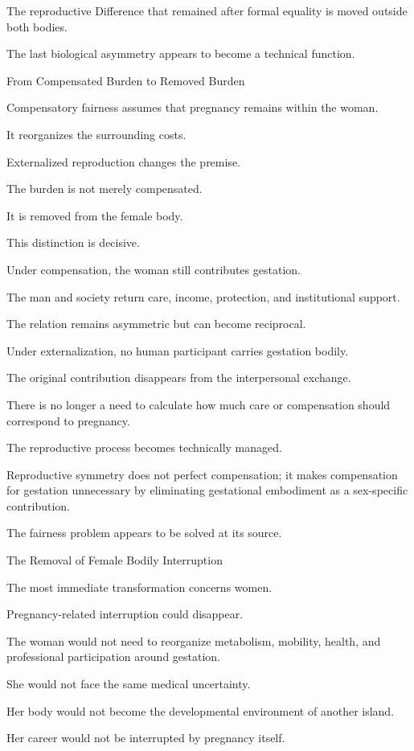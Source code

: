 The reproductive Difference that remained after formal equality is moved outside both bodies.

The last biological asymmetry appears to become a technical function.

From Compensated Burden to Removed Burden

Compensatory fairness assumes that pregnancy remains within the woman.

It reorganizes the surrounding costs.

Externalized reproduction changes the premise.

The burden is not merely compensated.

It is removed from the female body.

This distinction is decisive.

Under compensation, the woman still contributes gestation.

The man and society return care, income, protection, and institutional support.

The relation remains asymmetric but can become reciprocal.

Under externalization, no human participant carries gestation bodily.

The original contribution disappears from the interpersonal exchange.

There is no longer a need to calculate how much care or compensation should correspond to pregnancy.

The reproductive process becomes technically managed.

Reproductive symmetry does not perfect compensation; it makes compensation for gestation unnecessary by eliminating gestational embodiment as a sex-specific contribution.

The fairness problem appears to be solved at its source.

The Removal of Female Bodily Interruption

The most immediate transformation concerns women.

Pregnancy-related interruption could disappear.

The woman would not need to reorganize metabolism, mobility, health, and professional participation around gestation.

She would not face the same medical uncertainty.

Her body would not become the developmental environment of another island.

Her career would not be interrupted by pregnancy itself.

